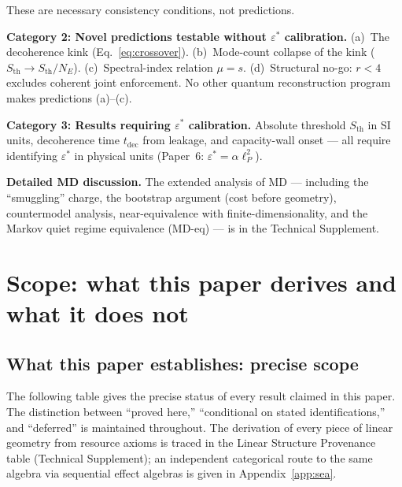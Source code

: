 \documentclass[11pt]{article}
\theoremstyle{remark}
\begin{document}
\smallskip\noindent These are necessary consistency conditions, not predictions.

\medskip\noindent\textbf{Category 2: Novel predictions testable without $\varepsilon^*$ calibration.}  (a)~The decoherence kink (Eq.~\eqref{eq:crossover}).  (b)~Mode-count collapse of the kink ($S_{\mathrm{th}} \to S_{\mathrm{th}}/N_E$).  (c)~Spectral-index relation $\mu = s$.  (d)~Structural no-go: $r < 4$ excludes coherent joint enforcement.  No other quantum reconstruction program makes predictions (a)--(c).

\medskip\noindent\textbf{Category 3: Results requiring $\varepsilon^*$ calibration.}  Absolute threshold $S_{\mathrm{th}}$ in SI units, decoherence time $t_{\mathrm{dec}}$ from leakage, and capacity-wall onset --- all require identifying $\varepsilon^*$ in physical units (Paper~6: $\varepsilon^* = \alpha\ell_P^2$).
\label{tab:empirical_cat3}

\smallskip\noindent\textbf{Detailed MD discussion.}\label{sec:MD_detail}  The extended analysis of MD --- including the ``smuggling'' charge, the bootstrap argument (cost before geometry), countermodel analysis, near-equivalence with finite-dimensionality, and the Markov quiet regime equivalence (MD-eq) --- is in the Technical Supplement.

\label{sec:Ldelta_verifications}\label{sec:LP_verification}\label{sec:witnesses}\label{sec:toy_kappa}\label{sec:qskel}\label{tab:bridge_generators}\label{tab:bridge_steps}\label{sec:overlap_detail}\label{box:overlap_example}\label{sec:P1P4_detail}\label{sec:examples}\label{box:MD_operational}\label{box:MD_deep}

\section{Scope: what this paper derives and what it does not}
\label{sec:scope}

\subsection{What this paper establishes: precise scope}
\label{sec:precise_scope}

The following table gives the precise status of every result claimed in this
paper.  The distinction between ``proved here,'' ``conditional on stated
identifications,'' and ``deferred'' is maintained throughout.  The derivation of every piece of linear geometry from resource axioms is traced in the Linear Structure Provenance table (Technical Supplement); an independent categorical route to the same algebra via sequential effect algebras is given in Appendix~\ref{app:sea}.
\end{document}
